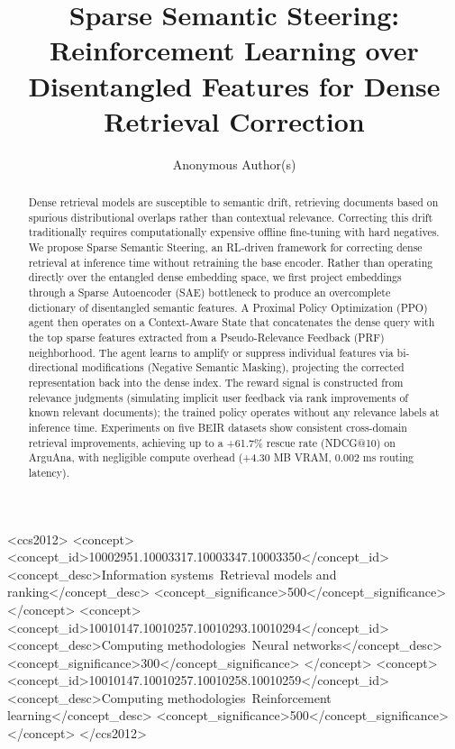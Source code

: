 \documentclass[sigconf]{acmart}
\begin{document}
\title{Sparse Semantic Steering: Reinforcement Learning over Disentangled Features for Dense Retrieval Correction}

\author{Anonymous Author(s)}

\renewcommand{\shortauthors}{Anonymous}

\begin{abstract}
Dense retrieval models are susceptible to semantic drift, retrieving documents based on spurious distributional overlaps rather than contextual relevance. Correcting this drift traditionally requires computationally expensive offline fine-tuning with hard negatives. We propose Sparse Semantic Steering, an RL-driven framework for correcting dense retrieval at inference time without retraining the base encoder. Rather than operating directly over the entangled dense embedding space, we first project embeddings through a Sparse Autoencoder (SAE) bottleneck to produce an overcomplete dictionary of disentangled semantic features. A Proximal Policy Optimization (PPO) agent then operates on a Context-Aware State that concatenates the dense query with the top sparse features extracted from a Pseudo-Relevance Feedback (PRF) neighborhood. The agent learns to amplify or suppress individual features via bi-directional modifications (Negative Semantic Masking), projecting the corrected representation back into the dense index. The reward signal is constructed from relevance judgments (simulating implicit user feedback via rank improvements of known relevant documents); the trained policy operates without any relevance labels at inference time. Experiments on five BEIR datasets show consistent cross-domain retrieval improvements, achieving up to a +61.7\% rescue rate (NDCG@10) on ArguAna, with negligible compute overhead (+4.30 MB VRAM, 0.002 ms routing latency).
\end{abstract}

\begin{CCSXML}
<ccs2012>
 <concept>
  <concept_id>10002951.10003317.10003347.10003350</concept_id>
  <concept_desc>Information systems~Retrieval models and ranking</concept_desc>
  <concept_significance>500</concept_significance>
 </concept>
 <concept>
  <concept_id>10010147.10010257.10010293.10010294</concept_id>
  <concept_desc>Computing methodologies~Neural networks</concept_desc>
  <concept_significance>300</concept_significance>
 </concept>
 <concept>
  <concept_id>10010147.10010257.10010258.10010259</concept_id>
  <concept_desc>Computing methodologies~Reinforcement learning</concept_desc>
  <concept_significance>500</concept_significance>
 </concept>
</ccs2012>
\end{CCSXML}
\end{document}
